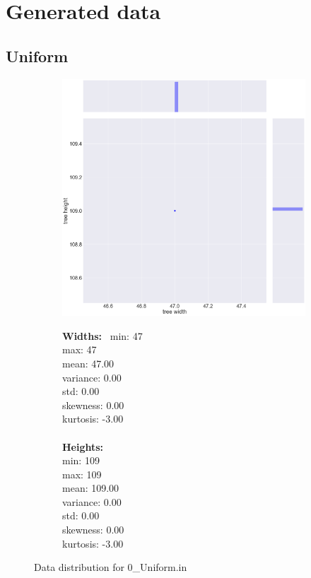 \chapter{Generated data}
\section{Uniform}
\begin{figure}[H]
\centering
\begin{subfigure}{.8\textwidth}
	\includegraphics[width=.9\textwidth]{img/0_UNIFORM_plot.png}
\end{subfigure}%
\begin{subfigure}{.2\textwidth}
  \centering
  \begin{minipage}{1\textwidth}
\textbf{Widths:}
\
min: 47
\\
max: 47
\\
mean: 47.00
\\
variance: 0.00
\\
std: 0.00
\\
skewness: 0.00
\\
kurtosis: -3.00
\\\\
\textbf{Heights:}
\\
min: 109
\\
max: 109
\\
mean: 109.00
\\
variance: 0.00
\\
std: 0.00
\\
skewness: 0.00
\\
kurtosis: -3.00
  \end{minipage}
\end{subfigure}
\caption{Data distribution for 0\_Uniform.in}
\label{appendix:data:uniform}
\end{figure}
